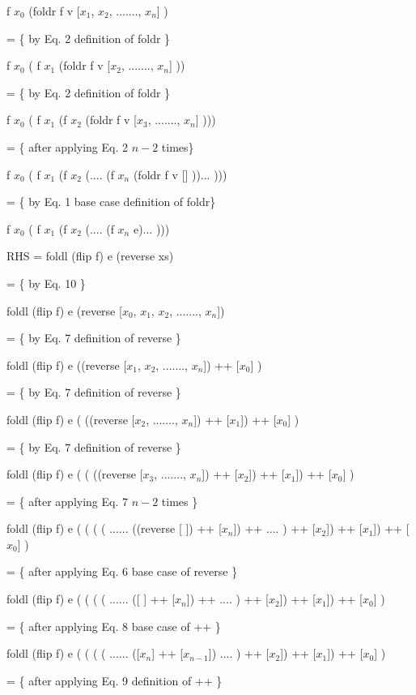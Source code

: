 \documentclass[twocolumn]{article}
\begin{document}
	f $x_{0}$ (foldr f v [$x_{1}$, $x_{2}$, ......., $x_{n}$] ) 
	
	= \{ by Eq. 2 definition of foldr \}
	
	f $x_{0}$ ( f $x_{1}$ (foldr f v [$x_{2}$,  ......., $x_{n}$] )) 

	= \{ by Eq. 2 definition of foldr \}
	
	f $x_{0}$ ( f $x_{1}$ (f $x_{2}$ (foldr f v [$x_{3}$,  ......., $x_{n}$] ))) 
	
	= \{ after applying Eq. 2 $n - 2$ times\}
	
	f $x_{0}$ ( f $x_{1}$ (f $x_{2}$ (.... (f $x_{n}$ (foldr f v [] ))... ))) 

	= \{ by Eq. 1 base case definition of foldr\}
	
	f $x_{0}$ ( f $x_{1}$ (f $x_{2}$ (.... (f $x_{n}$ e)... ))) 
	
	
	

RHS = foldl (flip f) e (reverse xs)

	 = \{ by Eq. 10 \}
	 
	 foldl (flip f) e (reverse [$x_{0}$, $x_{1}$, $x_{2}$, ......., $x_{n}$])	

	 = \{ by Eq. 7 definition of reverse \}
	 
	 foldl (flip f) e ((reverse [$x_{1}$, $x_{2}$, ......., $x_{n}$]) ++ [$x_{0}$] )
	 
	 = \{ by Eq. 7 definition of reverse \}
	 
	 foldl (flip f) e ( ((reverse [$x_{2}$, ......., $x_{n}$]) ++ [$x_{1}$]) ++ [$x_{0}$] )
	 
	 = \{ by Eq. 7 definition of reverse \}
	 
	 foldl (flip f) e ( ( ((reverse [$x_{3}$, ......., $x_{n}$]) ++ [$x_{2}$]) ++ [$x_{1}$]) ++ [$x_{0}$] )
	
	 = \{ after applying Eq. 7 $n - 2$ times \}
	 
	 foldl (flip f) e ( ( ( ( ...... ((reverse [ ]) ++ [$x_{n}$]) ++  .... ) ++ [$x_{2}$]) ++ [$x_{1}$]) ++ [$x_{0}$] )

	 = \{ after applying Eq. 6 base case of reverse \}
	 
	 foldl (flip f) e ( ( ( ( ...... ([ ] ++ [$x_{n}$]) ++  .... ) ++ [$x_{2}$]) ++ [$x_{1}$]) ++ [$x_{0}$] )

	 = \{ after applying Eq. 8 base case of ++ \}
	 
	 foldl (flip f) e ( ( ( ( ...... ([$x_{n}$] ++ [$x_{n-1}$]) .... ) ++ [$x_{2}$]) ++ [$x_{1}$]) ++ [$x_{0}$] )

	 = \{ after applying Eq. 9 definition of ++ \}
	 
\end{document}
